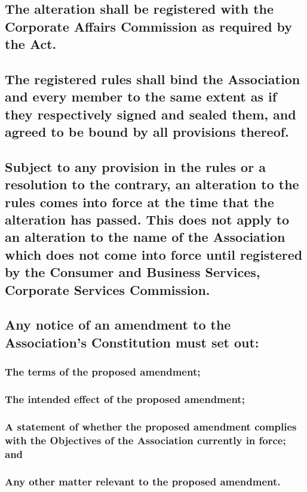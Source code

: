 \documentclass{article}
\newenvironment{subs}
  {\adjustwidth{2em}{0pt}}
  {\endadjustwidth}
\begin{document}
\begin{subs}
\begin{subs}
\begin{subs}
\subsection{The alteration shall be registered with the Corporate Affairs Commission as required by the Act.}
\subsection{The registered rules shall bind the Association and every member to the same extent as if they respectively signed and sealed them, and agreed to be bound by all provisions thereof.}
\subsection{Subject to any provision in the rules or a resolution to the contrary, an alteration to the rules comes into force at the time that the alteration has passed. This does not apply to an alteration to the name of the Association which does not come into force until registered by the Consumer and Business Services, Corporate Services Commission.}

\subsection{Any notice of an amendment to the Association's Constitution must set out:}
\begin{subs}
\subsubsection{The terms of the proposed amendment;}
\subsubsection{The intended effect of the proposed amendment;}
\subsubsection{A statement of whether the proposed amendment complies with the Objectives of the Association currently in force; and}
\subsubsection{Any other matter relevant to the proposed amendment.}
\end{subs}
\end{subs}
\end{document}
